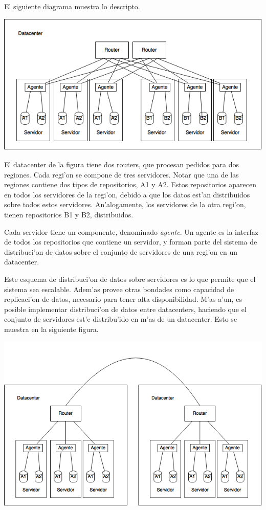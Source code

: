 El siguiente diagrama muestra lo descripto.

\includegraphics[width=15cm]{diagramas/datacenter.png}

\noindent
El datacenter de la figura tiene dos routers, que procesan pedidos para dos regiones. Cada regi'on se compone de tres servidores. Notar que una de las regiones contiene dos tipos de repositorios, A1 y A2. Estos repositorios aparecen en todos los servidores de la regi'on, debido a que los datos est'an distribuidos sobre todos estos servidores. An'alogamente, los servidores de la otra regi'on, tienen repositorios B1 y B2, distribuidos.

Cada servidor tiene un componente, denominado \textit{agente}. Un agente es la interfaz de todos los repositorios que contiene un servidor, y forman parte del sistema de distribuci'on de datos sobre el conjunto de servidores de una regi'on en un datacenter.

Este esquema de distribuci'on de datos sobre servidores es lo que permite que el sistema sea escalable. Adem'as provee otras bondades como capacidad de replicaci'on de datos, necesario para tener alta disponibilidad. M'as a'un, es posible implementar distribuci'on de datos entre datacenters, haciendo que el conjunto de servidores est'e distribu'ido en m'as de un datacenter. Esto se muestra en la siguiente figura.

\includegraphics[width=15cm]{diagramas/datacenterx2.png}


